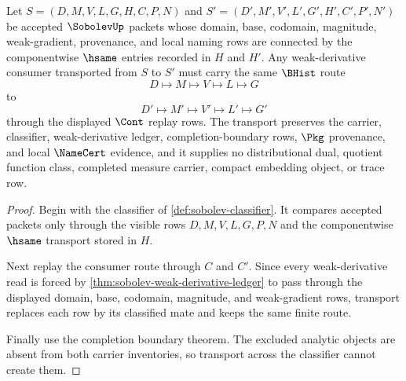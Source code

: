 \begin{theorem}
\label{thm:sobolev-weak-derivative-carrier-transport}
Let $S=(D,M,V,L,G,H,C,P,N)$ and $S'=(D',M',V',L',G',H',C',P',N')$ be accepted $\SobolevUp$ packets whose domain, base, codomain, magnitude, weak-gradient, provenance, and local naming rows are connected by the componentwise $\hsame$ entries recorded in $H$ and $H'$. Any weak-derivative consumer transported from $S$ to $S'$ must carry the same $\BHist$ route
$$
D \longmapsto M \longmapsto V \longmapsto L \longmapsto G
$$
to
$$
D' \longmapsto M' \longmapsto V' \longmapsto L' \longmapsto G'
$$
through the displayed $\Cont$ replay rows. The transport preserves the carrier, classifier, weak-derivative ledger, completion-boundary rows, $\Pkg$ provenance, and local $\NameCert$ evidence, and it supplies no distributional dual, quotient function class, completed measure carrier, compact embedding object, or trace row.
\end{theorem}
\begin{proof}
Begin with the classifier of \autoref{def:sobolev-classifier}. It compares accepted packets only through the visible rows $D,M,V,L,G,P,N$ and the componentwise $\hsame$ transport stored in $H$.

Next replay the consumer route through $C$ and $C'$. Since every weak-derivative read is forced by \autoref{thm:sobolev-weak-derivative-ledger} to pass through the displayed domain, base, codomain, magnitude, and weak-gradient rows, transport replaces each row by its classified mate and keeps the same finite route.

Finally use the completion boundary theorem. The excluded analytic objects are absent from both carrier inventories, so transport across the classifier cannot create them.
\end{proof}

